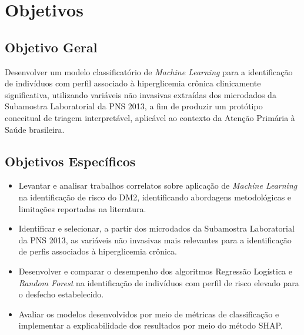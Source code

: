 \section{Objetivos}

\subsection{Objetivo Geral}
Desenvolver um modelo classificatório de \textit{Machine Learning} para a identificação de indivíduos com perfil associado à hiperglicemia crônica clinicamente significativa, utilizando variáveis não invasivas extraídas dos microdados da Subamostra Laboratorial da PNS 2013, a fim de produzir um protótipo conceitual de triagem interpretável, aplicável ao contexto da Atenção Primária à Saúde brasileira.
\subsection{Objetivos Específicos}
\begin{itemize}
    \item Levantar e analisar trabalhos correlatos sobre aplicação de \textit{Machine Learning} na identificação de risco do DM2, identificando abordagens metodológicas e limitações reportadas na literatura.
    \item Identificar e selecionar, a partir dos microdados da Subamostra Laboratorial da PNS 2013, as variáveis não invasivas mais relevantes para a identificação de perfis associados à hiperglicemia crônica.
    \item Desenvolver e comparar o desempenho dos algoritmos Regressão Logística e \textit{Random Forest} na identificação de indivíduos com perfil de risco elevado para o desfecho estabelecido.
    \item Avaliar os modelos desenvolvidos por meio de métricas de classificação e implementar a explicabilidade dos resultados por meio do método SHAP.
\end{itemize}